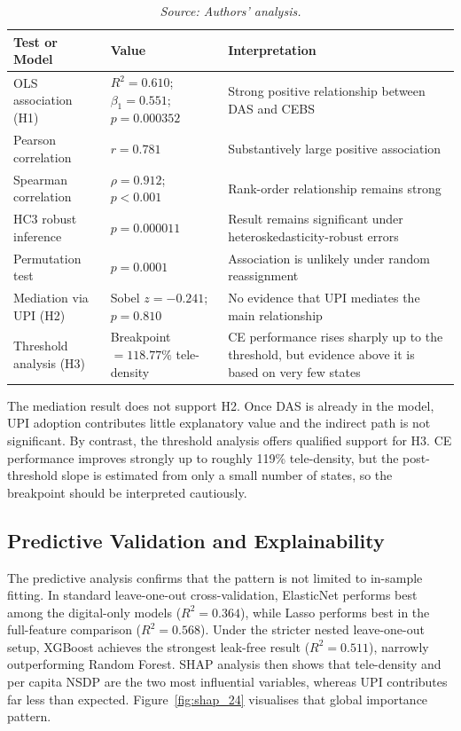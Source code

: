 \documentclass[10pt,a4paper]{article}
\newcommand{\tabsource}[1]{\caption*{\footnotesize\textit{Source: #1.}}}
\begin{document}
\begin{table}[htbp]
\centering
\caption{Core Statistical Results}
\label{tab:core_results_24}
\small
\begin{tabularx}{\textwidth}{@{}>{\raggedright\arraybackslash}X>{\raggedright\arraybackslash}p{2.2cm}>{\raggedright\arraybackslash}p{3.0cm}@{}}
\toprule
\textbf{Test or Model} & \textbf{Value} & \textbf{Interpretation} \\
\midrule
OLS association (H1) & $R^2=0.610$; $\beta_1=0.551$; $p=0.000352$ & Strong positive relationship between DAS and CEBS \\
Pearson correlation & $r=0.781$ & Substantively large positive association \\
Spearman correlation & $\rho=0.912$; $p<0.001$ & Rank-order relationship remains strong \\
HC3 robust inference & $p=0.000011$ & Result remains significant under heteroskedasticity-robust errors \\
Permutation test & $p=0.0001$ & Association is unlikely under random reassignment \\
Mediation via UPI (H2) & Sobel $z=-0.241$; $p=0.810$ & No evidence that UPI mediates the main relationship \\
Threshold analysis (H3) & Breakpoint $=118.77\%$ tele-density & CE performance rises sharply up to the threshold, but evidence above it is based on very few states \\
\bottomrule
\end{tabularx}
\tabsource{Authors' analysis}
\end{table}

The mediation result does not support H2. Once DAS is already in the model, UPI adoption contributes little explanatory value and the indirect path is not significant. By contrast, the threshold analysis offers qualified support for H3. CE performance improves strongly up to roughly 119\% tele-density, but the post-threshold slope is estimated from only a small number of states, so the breakpoint should be interpreted cautiously.

\subsection{Predictive Validation and Explainability}

The predictive analysis confirms that the pattern is not limited to in-sample fitting. In standard leave-one-out cross-validation, ElasticNet performs best among the digital-only models ($R^2=0.364$), while Lasso performs best in the full-feature comparison ($R^2=0.568$). Under the stricter nested leave-one-out setup, XGBoost achieves the strongest leak-free result ($R^2=0.511$), narrowly outperforming Random Forest. SHAP analysis then shows that tele-density and per capita NSDP are the two most influential variables, whereas UPI contributes far less than expected. Figure~\ref{fig:shap_24} visualises that global importance pattern.
\end{document}
